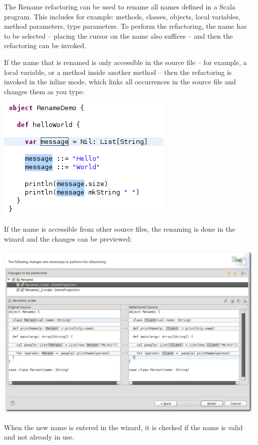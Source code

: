 \documentclass[10pt,a4paper,oneside]{scrreprt}
\begin{document}
The Rename refactoring can be used to rename all names defined in a Scala program. This includes for example: methods, classes, objects, local variables, method parameters, type parameters. To perform the refactoring, the name has to be selected -- placing the cursor on the name also suffices -- and then the refactoring can be invoked.

If the name that is renamed is only accessible in the source file -- for example, a local variable, or a method inside another method -- then the refactoring is invoked in the inline mode, which links all occurrences in the source file and changes them as you type:

\begin{center}
  \includegraphics[width=0.5\linewidth]{rename_screenshot_3.png}
\end{center}

If the name is accessible from other source files, the renaming is done in the wizard and the changes can be previewed:

\begin{center}
  \includegraphics[width=\linewidth]{rename_screenshot_2.png}
\end{center}

When the new name is entered in the wizard, it is checked if the name is valid and not already in use.
\end{document}
